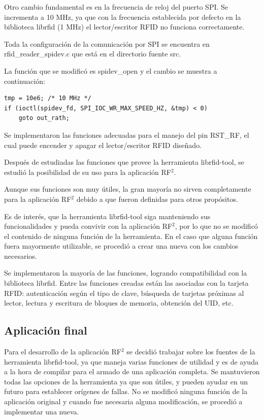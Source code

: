 \bigskip
Otro cambio fundamental es en la frecuencia de reloj del puerto SPI. Se incrementa a 10 MHz, ya que con la frecuencia establecida por defecto en la biblioteca librfid (1 MHz) el lector/escritor RFID no funciona correctamente. 

Toda la configuración de la comunicación por SPI se encuentra en rfid\_reader\_spidev.c que está en el directorio fuente src.

La función que se modificó es spidev\_open y el cambio se muestra a continuación:

\begin{verbatim}
tmp = 10e6; /* 10 MHz */
if (ioctl(spidev_fd, SPI_IOC_WR_MAX_SPEED_HZ, &tmp) < 0)
    goto out_rath;
\end{verbatim}

Se implementaron las funciones adecuadas para el manejo del pin RST\_RF, el cual puede encender y apagar el lector/escritor RFID diseñado.

\bigskip
Después de estudiadas las funciones que provee la herramienta librfid-tool, se estudió la posibilidad de su uso para la aplicación RF$^{2}$. 

Aunque sus funciones  son muy útiles, la gran mayoría no sirven completamente para la aplicación RF$^{2}$ debido a que fueron definidas para otros propósitos. 

Es de interés, que la herramienta librfid-tool siga manteniendo sus funcionalidades y pueda convivir con la aplicación RF$^{2}$, por lo que no se modificó el contenido de ninguna función de la herramienta. En el caso que alguna función fuera mayormente utilizable, se procedió a crear una nueva con los cambios necesarios.

Se implementaron la mayoría de las funciones, logrando compatibilidad con la biblioteca librfid. Entre las funciones creadas están las asociadas con la tarjeta RFID: autenticación según el tipo de clave, búsqueda de tarjetas próximas al lector, lectura y escritura de bloques de memoria, obtención del UID, etc.

\subsection{Aplicación final}

Para el desarrollo de la aplicación RF$^{2}$ se decidió trabajar sobre los fuentes de la herramienta librfid-tool, ya que maneja varias funciones de utilidad y es de ayuda a la hora de compilar para el armado de una aplicación completa. Se mantuvieron todas las opciones de la herramienta ya que son útiles, y pueden ayudar en un futuro para establecer orígenes de fallas. No se modificó ninguna función de la aplicación original y cuando fue necesaria alguna modificación, se procedió a implementar una nueva.

